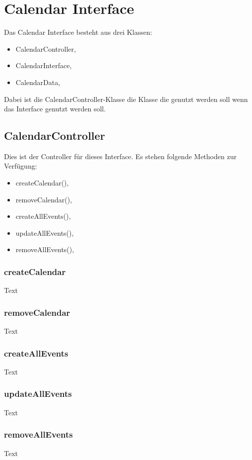 \chapter{Calendar Interface}
Das Calendar Interface besteht aus drei Klassen:
\begin{itemize}
     \item CalendarController,
     \item CalendarInterface,
     \item CalendarData, 
\end{itemize}

Dabei ist die CalendarController-Klasse die Klasse die genutzt werden soll wenn das Interface genutzt werden soll.

\section{CalendarController}
Dies ist der Controller für dieses Interface. Es stehen folgende Methoden zur Verfügung:
\begin{itemize}
     \item createCalendar(),
     \item removeCalendar(),
     \item createAllEvents(),
     \item updateAllEvents(),
     \item removeAllEvents(),
\end{itemize}

\subsection{createCalendar}
Text

\subsection{removeCalendar}
Text

\subsection{createAllEvents}
Text

\subsection{updateAllEvents}
Text

\subsection{removeAllEvents}
Text

